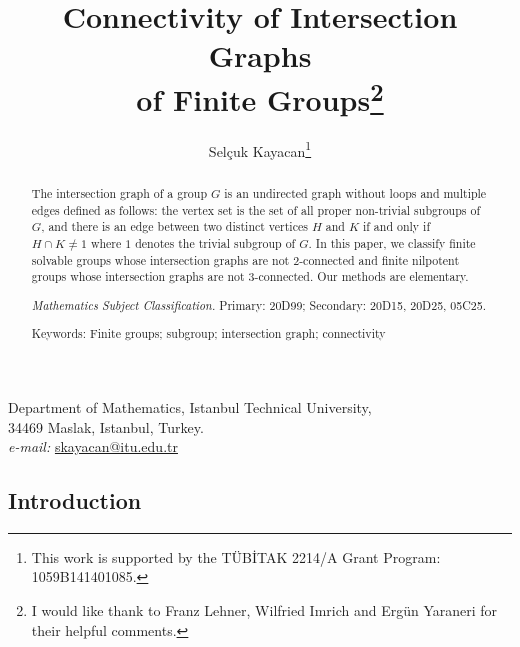 \documentclass[a4paper,12pt]{article}
\author{Sel\c{c}uk Kayacan\thanks{This work is supported by the T{\"U}B\.{I}TAK 2214/A Grant Program: 1059B141401085.}}
\title{Connectivity of Intersection Graphs\\ of Finite Groups\thanks{I would like thank to Franz Lehner, Wilfried Imrich and Erg\"un Yaraneri for their helpful comments.}}
\date{}
\theoremstyle{definition}
\theoremstyle{remark}
\theoremstyle{theorem}
\begin{document}
\maketitle

\small

\begin{center}
  Department of Mathematics, Istanbul Technical University,\\
  34469 Maslak, Istanbul, Turkey. \\
  {\it e-mail:} \href{mailto:skayacan@itu.edu.tr}{skayacan@itu.edu.tr}
\end{center}






\begin{abstract}
  The intersection graph of a group $G$ is an undirected graph without
  loops and multiple edges defined as follows: the vertex set is the
  set of all proper non-trivial subgroups of $G$, and there is an edge
  between two distinct vertices $H$ and $K$ if and only if
  $H\cap K \neq 1$ where $1$ denotes the trivial subgroup of $G$. In
  this paper, we classify finite solvable groups whose intersection
  graphs are not $2$-connected and finite nilpotent groups whose
  intersection graphs are not $3$-connected. Our methods are
  elementary.

  \smallskip
   {\it Mathematics Subject Classification.} Primary:
  20D99; Secondary: 20D15, 20D25, 05C25.

  \smallskip
  \noindent Keywords: Finite groups; subgroup; intersection graph;
  connectivity
\end{abstract}



\subsection*{Introduction}


\end{document}
